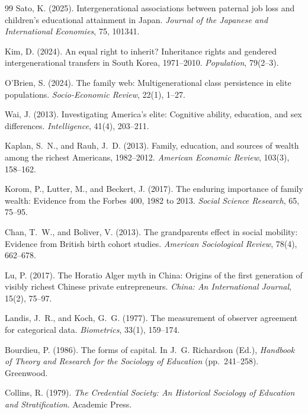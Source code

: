 \documentclass[11pt,a4paper]{article}
\begin{document}
\begin{thebibliography}{99}
Sato, K. (2025). Intergenerational associations between paternal job loss and children's educational attainment in Japan. \emph{Journal of the Japanese and International Economies}, 75, 101341.

Kim, D. (2024). An equal right to inherit? Inheritance rights and gendered intergenerational transfers in South Korea, 1971--2010. \emph{Population}, 79(2--3).

O'Brien, S. (2024). The family web: Multigenerational class persistence in elite populations. \emph{Socio-Economic Review}, 22(1), 1--27.

Wai, J. (2013). Investigating America's elite: Cognitive ability, education, and sex differences. \emph{Intelligence}, 41(4), 203--211.

Kaplan, S.~N., and Rauh, J.~D. (2013). Family, education, and sources of wealth among the richest Americans, 1982--2012. \emph{American Economic Review}, 103(3), 158--162.

Korom, P., Lutter, M., and Beckert, J. (2017). The enduring importance of family wealth: Evidence from the Forbes 400, 1982 to 2013. \emph{Social Science Research}, 65, 75--95.

Chan, T.~W., and Boliver, V. (2013). The grandparents effect in social mobility: Evidence from British birth cohort studies. \emph{American Sociological Review}, 78(4), 662--678.

Lu, P. (2017). The Horatio Alger myth in China: Origins of the first generation of visibly richest Chinese private entrepreneurs. \emph{China: An International Journal}, 15(2), 75--97.

Landis, J.~R., and Koch, G.~G. (1977). The measurement of observer agreement for categorical data. \emph{Biometrics}, 33(1), 159--174.

Bourdieu, P. (1986). The forms of capital. In J.~G. Richardson (Ed.), \emph{Handbook of Theory and Research for the Sociology of Education} (pp.~241--258). Greenwood.

Collins, R. (1979). \emph{The Credential Society: An Historical Sociology of Education and Stratification}. Academic Press.

\end{thebibliography}
\end{document}
